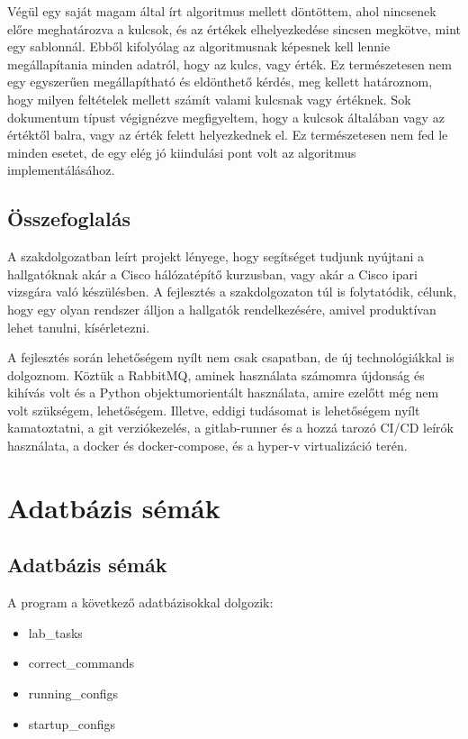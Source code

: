 \documentclass[12pt]{report}
\begin{document}
Végül egy saját magam által írt algoritmus mellett döntöttem, ahol nincsenek előre meghatározva a kulcsok, és az értékek elhelyezkedése sincsen megkötve, mint egy sablonnál. Ebből kifolyólag az algoritmusnak képesnek kell lennie megállapítania minden adatról, hogy az kulcs, vagy érték. Ez természetesen nem egy egyszerűen megállapítható és eldönthető kérdés, meg kellett határoznom, hogy milyen feltételek mellett számít valami kulcsnak vagy értéknek. Sok dokumentum típust végignézve megfigyeltem, hogy a kulcsok általában vagy az értéktől balra, vagy az érték felett helyezkednek el. Ez természetesen nem fed le minden esetet, de egy elég jó kiindulási pont volt az algoritmus implementálásához. 


\section{Összefoglalás}

A szakdolgozatban leírt projekt lényege, hogy segítséget tudjunk nyújtani a hallgatóknak akár a Cisco hálózatépítő kurzusban, vagy akár a Cisco ipari vizsgára való készülésben. A fejlesztés a szakdolgozaton túl is folytatódik, célunk, hogy egy olyan rendszer álljon a hallgatók rendelkezésére, amivel produktívan lehet tanulni, kísérletezni.


A fejlesztés során lehetőségem nyílt nem csak csapatban, de új technológiákkal is dolgoznom. Köztük a RabbitMQ, aminek használata számomra újdonság és kihívás volt és a Python objektumorientált használata, amire ezelőtt még nem volt szükségem, lehetőségem. Illetve, eddigi tudásomat is lehetőségem nyílt kamatoztatni, a git verziókezelés, a gitlab-runner és a hozzá tarozó CI/CD leírók használata, a docker és docker-compose, és a hyper-v virtualizáció terén.

\chapter{Adatbázis sémák}
\section{Adatbázis sémák}


A program a következő adatbázisokkal dolgozik:

\singlespacing
\begin{itemize}
    \item lab\_tasks
    \item correct\_commands
    \item running\_configs
    \item startup\_configs
\end{itemize}
\end{document}
